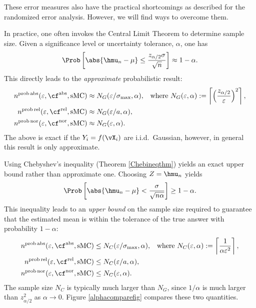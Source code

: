 \documentclass[12pt]{amsart}
\DeclareMathOperator{\abso}{abs}
\DeclareMathOperator{\rel}{rel}
\DeclareMathOperator{\nor}{nor}
\DeclareMathOperator{\prob}{prob}
\DeclareMathOperator{\sMC}{sMC}
\begin{document}
These error measures also have the practical shortcomings as described for the randomized error analysis.  However, we will find ways to overcome them.


In practice, one often invokes the Central Limit Theorem to determine sample size. Given a significance level or uncertainty tolerance, $\alpha$, one has
\[
\Prob\left[\abs{\hmu_n-\mu} \le \frac{z_{\alpha/2} \sigma}{\sqrt{n}} \right] \approx 1-\alpha.
\]
This directly leads to  the \emph{approximate} probabilistic result:
\begin{subequations} \label{proberrcritsampleGauss}
\begin{align}
n^{\prob\abso}(\varepsilon,\cf^{\abso},\sMC) &\approx  N_{G}(\varepsilon/\sigma_{\max},\alpha), & \text{where } N_{G}(\varepsilon,\alpha) :=\left \lceil \left(\frac{z_{\alpha/2}}{\varepsilon}\right)^2 \right \rceil,\\
n^{\prob\rel}(\varepsilon,\cf^{\rel},\sMC) & \approx  N_{G}(\varepsilon/a,\alpha), \\
n^{\prob\nor}(\varepsilon,\cf^{\nor},\sMC) &\approx  N_{G}(\varepsilon,\alpha).
\end{align}
\end{subequations}
The above is exact if the $Y_i=f(\vX_i)$ are i.i.d.\ Gaussian, however, in general this result is only approximate.

Using Chebyshev's inequality (Theorem \ref{Chebineqthm}) yields an exact upper bound rather than approximate one.  Choosing $Z=\hmu_n$ yields
\[
\Prob\left[\abs{\hmu_n-\mu} < \frac{\sigma}{\sqrt{n \alpha}} \right] \ge 1-\alpha.
\]
This inequality leads to an \emph{upper bound} on the sample size required to guarantee that the estimated mean is within the tolerance of the true answer with probability $1-\alpha$:
\begin{subequations} \label{proberrcritsampleCheby}
\begin{align}
n^{\prob\abso}(\varepsilon,\cf^{\abso},\sMC) &\le N_{C}(\varepsilon/\sigma_{\max},\alpha), & \text{where }N_{C}(\varepsilon,\alpha) :=\left \lceil \frac{1}{\alpha\varepsilon^2} \right \rceil,\\
n^{\prob\rel}(\varepsilon,\cf^{\rel},\sMC) & \le N_{C}(\varepsilon/a,\alpha), \\
n^{\prob\nor}(\varepsilon,\cf^{\nor},\sMC) &\le N_{C}(\varepsilon,\alpha).
\end{align}
\end{subequations}
The sample size $N_C$ is typically much larger than $ N_G$, since $1/\alpha$ is much larger than $z_{\alpha/2}^2$ as $\alpha \to 0$.  Figure \ref{alphacomparefig} compares these two quantities.
\end{document}
